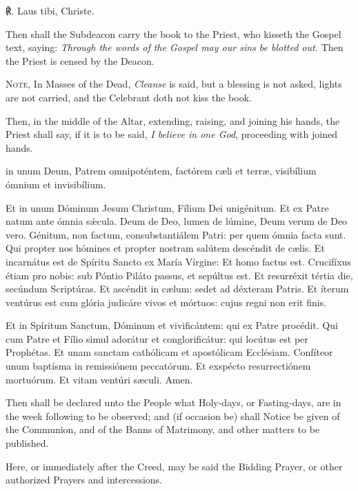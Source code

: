 ℟. Laus tibi, Christe.
\begin{rubric}
    Then shall the Subdeacon carry the book to the Priest, who kisseth the Gospel text, saying: \emph{Through the words of the Gospel may our sins be blotted out.} Then the Priest is censed by the Deacon.\par
    \textsc{Note,} In Masses of the Dead, \emph{Cleanse} is said, but a blessing is not asked, lights are not carried, and the Celebrant doth not kiss the book.
\end{rubric}
\begin{rubric}
    Then, in the middle of the Altar, extending, raising, and joining his hands, the Priest shall say, if it is to be said, \emph{I believe in one God}, proceeding with joined hands.
\end{rubric}
\label{NiceneCreed}
 in unum Deum, Patrem omnipoténtem, factórem c{\ae}li et terr{\ae}, visibílium ómnium et invisibílium.\par
    Et in unum Dóminum Jesum Christum, Fílium Dei unigénitum. Et ex Patre natum ante ómnia sǽcula. Deum de Deo, lumen de lúmine, Deum verum de Deo vero. Génitum, non factum, consubstantiálem Patri: per quem ómnia facta sunt. Qui propter nos hómines et propter nostram salútem descéndit de c{\ae}lis.  Et incarnátus est de Spíritu Sancto ex María Vírgine: Et homo factus est.  Crucifíxus étiam pro nobis: sub Póntio Piláto passus, et sepúltus est. Et resurréxit tértia die, secúndum Scriptúras. Et ascéndit in c{\ae}lum: sedet ad déxteram Patris. Et íterum ventúrus est cum glória judicáre vivos et mórtuos: cujus regni non erit finis.\par
    Et in Spíritum Sanctum, Dóminum et vivificántem: qui ex Patre procédit. Qui cum Patre et Fílio simul adorátur et conglorificátur: qui locútus est per Prophétas. Et unam sanctam cathólicam et apostólicam Ecclésiam. Confíteor unum baptísma in remissiónem peccatórum. Et exspécto resurrectiónem mortuórum. {} Et vitam ventúri s{\ae}culi. Amen.
\begin{rubric}
Then shall be declared unto the People what Holy-days, or Fasting-days, are in the week following to be observed; and (if occasion be) shall Notice be given of the Communion, and of the Banns of Matrimony, and other matters to be published.
\end{rubric}

\begin{rubric}
Here, or immediately after the Creed, may be said the Bidding Prayer, or other authorized Prayers and intercessions.
\end{rubric}

